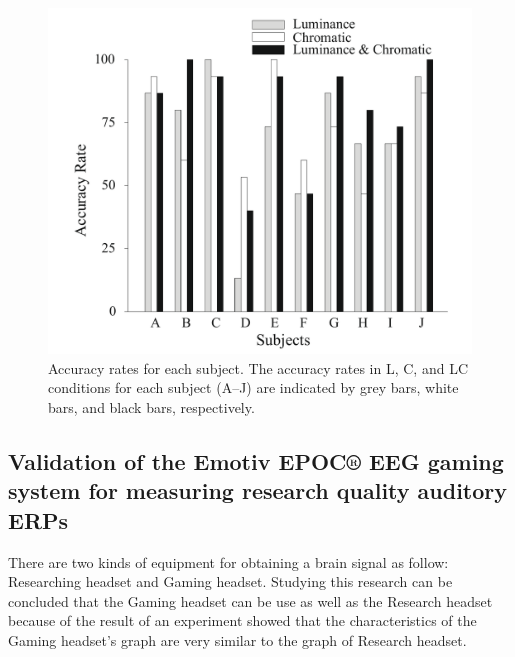 \begin{figure}[h]
	\centering
  	\includegraphics[scale = 0.5]{chapter2/23.pdf}
  	\caption{Accuracy rates for each subject. The accuracy rates in L, C, and LC conditions for each subject (A–J) are indicated by grey bars, white bars, and black bars, respectively.}
\end{figure}

\newpage
\subsection {Validation of the Emotiv EPOC® EEG gaming system for measuring research quality auditory ERPs\cite{ref4}}
\hspace{1.5cm} There are two kinds of equipment for obtaining a brain signal as follow: Researching headset and Gaming headset. Studying this research can be concluded that the Gaming headset can be use as well as the Research headset because of the result of an experiment showed that the characteristics of the Gaming headset's graph are very similar to the graph of Research headset.

